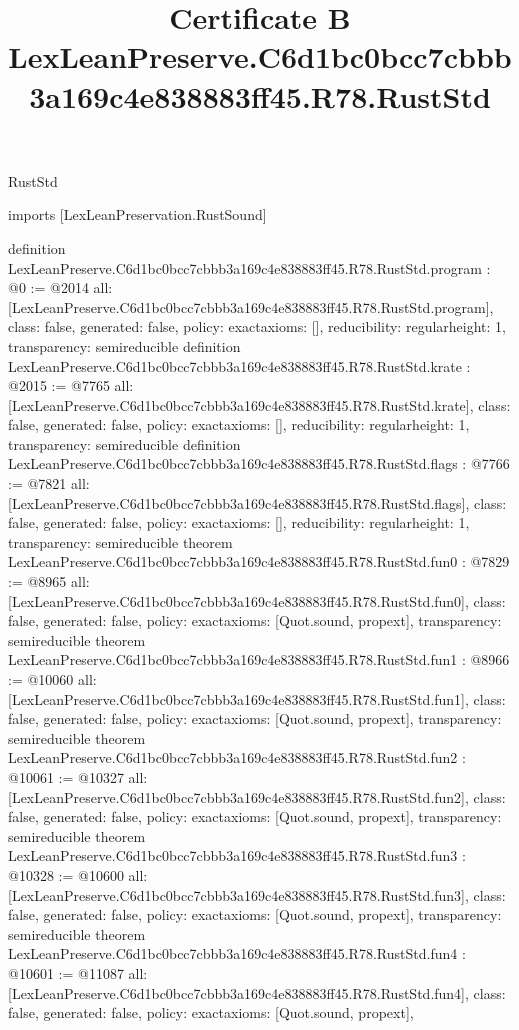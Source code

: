 \begin{lexlean}{RustStd}
\title{Certificate B LexLeanPreserve.C6d1bc0bcc7cbbb3a169c4e838883ff45.R78.RustStd}
\begin{coremodule}
imports [LexLeanPreservation.RustSound]

definition LexLeanPreserve.C6d1bc0bcc7cbbb3a169c4e838883ff45.R78.RustStd.program : @0 := @2014 {
  all: [LexLeanPreserve.C6d1bc0bcc7cbbb3a169c4e838883ff45.R78.RustStd.program],
  class: false,
  generated: false,
  policy: exact{axioms: []},
  reducibility: regular{height: 1},
  transparency: semireducible
}
definition LexLeanPreserve.C6d1bc0bcc7cbbb3a169c4e838883ff45.R78.RustStd.krate : @2015 := @7765 {
  all: [LexLeanPreserve.C6d1bc0bcc7cbbb3a169c4e838883ff45.R78.RustStd.krate],
  class: false,
  generated: false,
  policy: exact{axioms: []},
  reducibility: regular{height: 1},
  transparency: semireducible
}
definition LexLeanPreserve.C6d1bc0bcc7cbbb3a169c4e838883ff45.R78.RustStd.flags : @7766 := @7821 {
  all: [LexLeanPreserve.C6d1bc0bcc7cbbb3a169c4e838883ff45.R78.RustStd.flags],
  class: false,
  generated: false,
  policy: exact{axioms: []},
  reducibility: regular{height: 1},
  transparency: semireducible
}
theorem LexLeanPreserve.C6d1bc0bcc7cbbb3a169c4e838883ff45.R78.RustStd.fun0 : @7829 := @8965 {
  all: [LexLeanPreserve.C6d1bc0bcc7cbbb3a169c4e838883ff45.R78.RustStd.fun0],
  class: false,
  generated: false,
  policy: exact{axioms: [Quot.sound, propext]},
  transparency: semireducible
}
theorem LexLeanPreserve.C6d1bc0bcc7cbbb3a169c4e838883ff45.R78.RustStd.fun1 : @8966 := @10060 {
  all: [LexLeanPreserve.C6d1bc0bcc7cbbb3a169c4e838883ff45.R78.RustStd.fun1],
  class: false,
  generated: false,
  policy: exact{axioms: [Quot.sound, propext]},
  transparency: semireducible
}
theorem LexLeanPreserve.C6d1bc0bcc7cbbb3a169c4e838883ff45.R78.RustStd.fun2 : @10061 := @10327 {
  all: [LexLeanPreserve.C6d1bc0bcc7cbbb3a169c4e838883ff45.R78.RustStd.fun2],
  class: false,
  generated: false,
  policy: exact{axioms: [Quot.sound, propext]},
  transparency: semireducible
}
theorem LexLeanPreserve.C6d1bc0bcc7cbbb3a169c4e838883ff45.R78.RustStd.fun3 : @10328 := @10600 {
  all: [LexLeanPreserve.C6d1bc0bcc7cbbb3a169c4e838883ff45.R78.RustStd.fun3],
  class: false,
  generated: false,
  policy: exact{axioms: [Quot.sound, propext]},
  transparency: semireducible
}
theorem LexLeanPreserve.C6d1bc0bcc7cbbb3a169c4e838883ff45.R78.RustStd.fun4 : @10601 := @11087 {
  all: [LexLeanPreserve.C6d1bc0bcc7cbbb3a169c4e838883ff45.R78.RustStd.fun4],
  class: false,
  generated: false,
  policy: exact{axioms: [Quot.sound, propext]},
}
\end{coremodule}
\end{lexlean}
